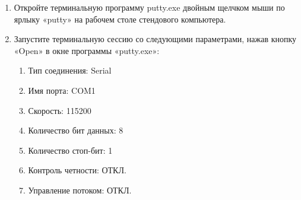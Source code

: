 \begin{enumerate}
  \item Откройте терминальную программу putty.exe двойным щелчком мыши по ярлыку «putty» на рабочем столе стендового компьютера.
  \item Запустите терминальную сессию со следующими параметрами, нажав кнопку «Open» в окне программы «putty.exe»:
  \begin{enumerate}
    \item Тип соединения: Serial
    \item Имя порта: COM1
    \item Скорость: 115200
    \item Количество бит данных: 8
    \item Количество стоп-бит: 1
    \item Контроль четности: ОТКЛ.
    \item Управление потоком: ОТКЛ.
  \end{enumerate}
\end{enumerate}